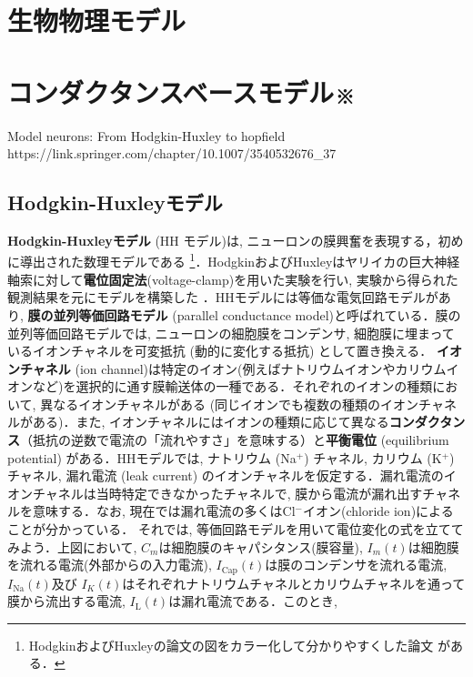 \section{生物物理モデル}
\section{コンダクタンスベースモデル※}
Model neurons: From Hodgkin-Huxley to hopfield
https://link.springer.com/chapter/10.1007/3540532676_37
\subsection{Hodgkin-Huxleyモデル}
\textbf{Hodgkin-Huxleyモデル} (HH モデル)は, ニューロンの膜興奮を表現する，初めに導出された数理モデルである \citep{Hodgkin1952-gy}\footnote{HodgkinおよびHuxleyの論文の図をカラー化して分かりやすくした論文 \citep{Hopper2022-xj} がある．}．HodgkinおよびHuxleyはヤリイカの巨大神経軸索に対して\textbf{電位固定法}(voltage-clamp)を用いた実験を行い, 実験から得られた観測結果を元にモデルを構築した \citep{Schwiening2012-pi}．HHモデルには等価な電気回路モデルがあり, \textbf{膜の並列等価回路モデル} (parallel conductance model)と呼ばれている．膜の並列等価回路モデルでは, ニューロンの細胞膜をコンデンサ, 細胞膜に埋まっているイオンチャネルを可変抵抗 (動的に変化する抵抗) として置き換える．
\textbf{イオンチャネル} (ion channel)は特定のイオン(例えばナトリウムイオンやカリウムイオンなど)を選択的に通す膜輸送体の一種である．それぞれのイオンの種類において, 異なるイオンチャネルがある (同じイオンでも複数の種類のイオンチャネルがある)．また, イオンチャネルにはイオンの種類に応じて異なる\textbf{コンダクタンス}（抵抗の逆数で電流の「流れやすさ」を意味する）と\textbf{平衡電位} (equilibrium potential) がある．HHモデルでは, ナトリウム (Na$^{+}$) チャネル, カリウム (K$^{+}$) チャネル, 漏れ電流 (leak current) のイオンチャネルを仮定する．漏れ電流のイオンチャネルは当時特定できなかったチャネルで, 膜から電流が漏れ出すチャネルを意味する．なお, 現在では漏れ電流の多くはCl$^{-}$イオン(chloride ion)によることが分かっている．
それでは, 等価回路モデルを用いて電位変化の式を立ててみよう．上図において, $C_m$は細胞膜のキャパシタンス(膜容量), $I_{m}(t)$は細胞膜を流れる電流(外部からの入力電流), $I_\text{Cap}(t)$は膜のコンデンサを流れる電流, $I_\text{Na}(t)$及び $I_K(t)$はそれぞれナトリウムチャネルとカリウムチャネルを通って膜から流出する電流, $I_\text{L}(t)$は漏れ電流である．このとき, 
